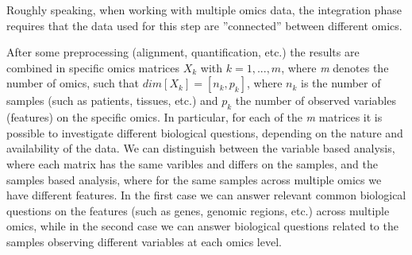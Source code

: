 Roughly speaking, when working with multiple omics data, the integration phase requires that the data used for this step are ''connected'' between different omics.




After some preprocessing (alignment, quantification, etc.) the results are combined in specific omics matrices $X_k$ with  $k=1,...,m$, where \textit{m} denotes the number of omics, such that $dim[X_k]=[n_k, p_k]$, where $n_k$ is the number of samples (such as patients, tissues, etc.) and $p_k$ the number of observed variables (features) on the specific omics.
In particular, for each of the \textit{m} matrices it is possible to investigate different biological questions, depending on the nature and availability of the data.
We can distinguish between the variable based analysis, where each matrix has the same varibles and differs on the samples, and the samples based analysis, where for the same samples across multiple omics we have different features.
In the first case we can answer relevant common biological questions on the features (such as genes, genomic regions, etc.) across multiple omics, while in the second case we can answer biological questions related to the samples observing different variables at each omics level.

